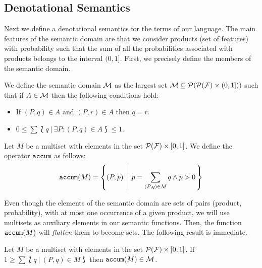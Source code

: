 \subsection{Denotational Semantics}
\label{sec:stat:den}

Next we define a denotational semantics for the terms of our language. The main features of the semantic domain are that we consider products (set of features) with probability such that the sum of all the probabilities associated with products belongs to the interval $(0,1]$. First, we
precisely define the members of the semantic domain.


\bdfn\label{def:den:pr}
We define the semantic domain ${\cal M}$ as the largest set ${\cal M}\subseteq{\cal P}({\cal P}({\cal F})\times
  (0,1]))$ such that if $A\in{\cal M}$ then the following
  conditions hold:
  \begin{itemize}
  \item If $(P,q)\in A$ and $(P,r)\in A$ then $q=r$.
  \item $0\leq \sum \lbag q \ | \ \exists P: (P,q)\in A\rbag \leq 1$.
  \end{itemize}


Let $M$ be a multiset  with elements in the set ${\cal P}({\cal F})\times [0,1]$.
We define the operator $\mathtt{accum}$ as follows:
  $$\accum(M) = \left\{(P,p)\ \left| \ p=\sum_{(P,q)\in M}q \wedge p>0\right. \right\}$$
\edfn

Even though the elements of the semantic domain are sets of pairs (product, probability), with at most one occurrence of a given product, we will use multisets as auxiliary elements in our semantic functions. Then, the function $\mathtt{accum}(M)$ will \emph{flatten} them to become sets.
The following result is immediate.

\bprop\label{prop:pr:accum}
 Let $M$ be a multiset with elements in the set ${\cal P}({\cal F})\times
 [0,1]$. If $1\geq\sum\lbag q\ |\ (P,q)\in M\rbag$
 then $\mathtt{accum}(M)\in{\cal M}$.
\eprop


